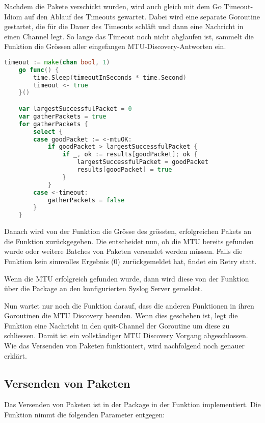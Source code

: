 Nachdem die Pakete verschickt wurden, wird auch gleich mit dem Go Timeout-Idiom auf den Ablauf des Timeouts gewartet. Dabei wird eine separate Goroutine gestartet, die für die Dauer des Timeouts schläft und dann eine Nachricht in einen Channel legt. So lange das Timeout noch nicht abglaufen ist, sammelt die  Funktion die Grössen aller eingefangen MTU-Discovery-Antworten ein.

\begin{lstlisting}[language=go, caption=Antworten einsammeln in mtu.sendBatch(..)]    
	timeout := make(chan bool, 1)
	go func() {
		time.Sleep(timeoutInSeconds * time.Second)
		timeout <- true
	}()

	var largestSuccessfulPacket = 0
	var gatherPackets = true
	for gatherPackets {
		select {
		case goodPacket := <-mtuOK:
			if goodPacket > largestSuccessfulPacket {
				if _, ok := results[goodPacket]; ok {
					largestSuccessfulPacket = goodPacket
					results[goodPacket] = true
				}
			}
		case <-timeout:
			gatherPackets = false
		}
	}
\end{lstlisting}

Danach wird von der  Funktion die Grösse des grössten, erfolgreichen Pakets an die  Funktion zurückgegeben. Die  entscheidet nun, ob die \ac{MTU} bereits gefunden wurde oder weitere Batches von Paketen versendet werden müssen.
Falls die  Funktion kein sinnvolles Ergebnis (0) zurückgemeldet hat, findet ein Retry statt.

Wenn die \ac{MTU} erfolgreich gefunden wurde, dann wird diese von der  Funktion über die  Package an den konfigurierten Syslog Server gemeldet.

Nun wartet nur noch die  Funktion darauf, dass die anderen  Funktionen in ihren Goroutinen die \ac{MTU} Discovery beenden. Wenn dies geschehen ist, legt die  Funktion eine Nachricht in den quit-Channel der  Goroutine um diese zu schliessen. Damit ist ein vollständiger \ac{MTU} Discovery Vorgang abgeschlossen. Wie  das Versenden von Paketen funktioniert, wird nachfolgend noch genauer erklärt.

\subsection{Versenden von Paketen}
Das Versenden von Paketen ist in der  Package in der  Funktion implementiert. Die  Funktion nimmt die folgenden Parameter entgegen:

